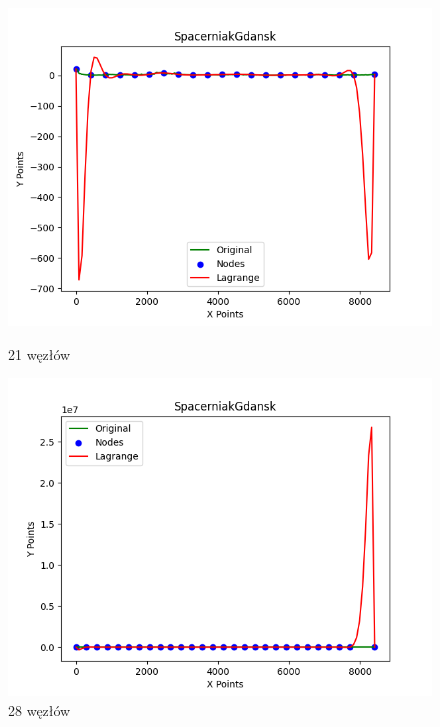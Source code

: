 \documentclass{article}
\begin{document}
\begin{figure}[H]
    \centering
    \begin{minipage}[b]{0.49\textwidth}
        \centering
        \includegraphics[width=\textwidth]{plots/SpacerniakGdansk_lagrange_21.png}
        \caption{21 węzłów}
        \label{fig:21nodes}
    \end{minipage}
    \hfill
    \begin{minipage}[b]{0.49\textwidth}
        \centering
        \includegraphics[width=\textwidth]{plots/SpacerniakGdansk_lagrange_28.png}
        \caption{28 węzłów}
        \label{fig:28nodes}
    \end{minipage}
\end{figure}
\end{document}
